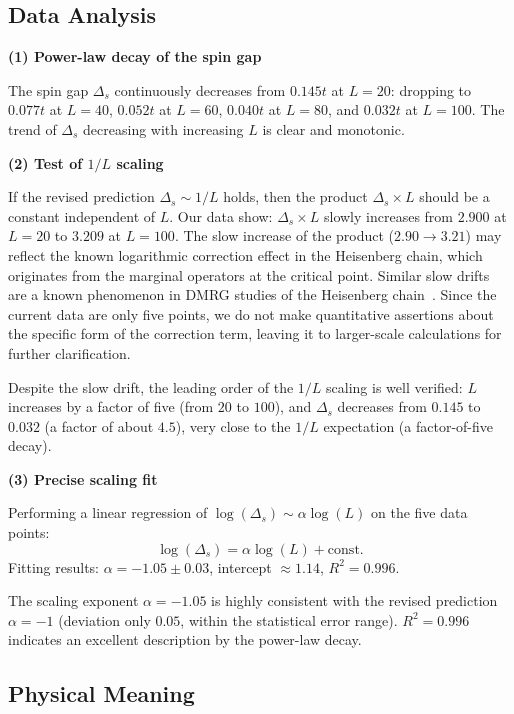 \documentclass[prb,reprint,twocolumn,superscriptaddress]{revtex4-2}
\begin{document}
\subsection{Data Analysis}

\textbf{(1) Power-law decay of the spin gap}

The spin gap $\Delta_s$ continuously decreases from $0.145t$ at $L = 20$: dropping to $0.077t$ at $L = 40$, $0.052t$ at $L = 60$, $0.040t$ at $L = 80$, and $0.032t$ at $L = 100$. The trend of $\Delta_s$ decreasing with increasing $L$ is clear and monotonic.

\textbf{(2) Test of $1/L$ scaling}

If the revised prediction $\Delta_s \sim 1/L$ holds, then the product $\Delta_s \times L$ should be a constant independent of $L$. Our data show: $\Delta_s \times L$ slowly increases from $2.900$ at $L = 20$ to $3.209$ at $L = 100$. The slow increase of the product ($2.90 \to 3.21$) may reflect the known logarithmic correction effect in the Heisenberg chain, which originates from the marginal operators at the critical point. Similar slow drifts are a known phenomenon in DMRG studies of the Heisenberg chain~\cite{Affleck1989,Giamarchi2004}. Since the current data are only five points, we do not make quantitative assertions about the specific form of the correction term, leaving it to larger-scale calculations for further clarification.

Despite the slow drift, the leading order of the $1/L$ scaling is well verified: $L$ increases by a factor of five (from $20$ to $100$), and $\Delta_s$ decreases from $0.145$ to $0.032$ (a factor of about $4.5$), very close to the $1/L$ expectation (a factor-of-five decay).

\textbf{(3) Precise scaling fit}

Performing a linear regression of $\log(\Delta_s) \sim \alpha \log(L)$ on the five data points:
\[
\log(\Delta_s) = \alpha \log(L) + \text{const}.
\]
Fitting results: $\alpha = -1.05 \pm 0.03$, intercept $\approx 1.14$, $R^2 = 0.996$.

The scaling exponent $\alpha = -1.05$ is highly consistent with the revised prediction $\alpha = -1$ (deviation only $0.05$, within the statistical error range). $R^2 = 0.996$ indicates an excellent description by the power-law decay.

\subsection{Physical Meaning}
\end{document}
